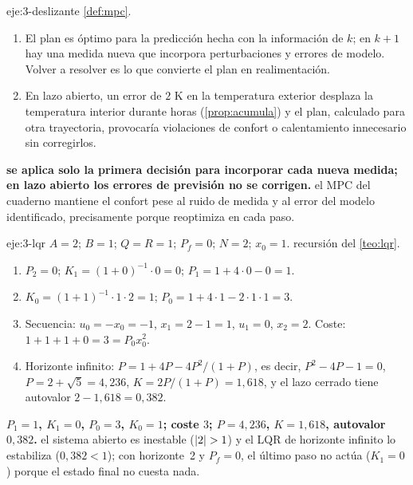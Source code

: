 \begin{solucion}{eje:3-deslizante}
\planteamiento \cref{def:mpc}.
\pasos
\begin{enumerate}[label=\arabic*.]
  \item El plan es óptimo para la predicción hecha con la información de $k$; en $k+1$ hay una medida nueva que incorpora perturbaciones y errores de modelo. Volver a resolver es lo que convierte el plan en realimentación.
  \item En lazo abierto, un error de $2$ K en la temperatura exterior desplaza la temperatura interior durante horas (\cref{prop:acumula}) y el plan, calculado para otra trayectoria, provocaría violaciones de confort o calentamiento innecesario sin corregirlos.
\end{enumerate}
\resultado \textbf{se aplica solo la primera decisión para incorporar cada nueva medida; en lazo abierto los errores de previsión no se corrigen.}
\comprobacion el MPC del cuaderno mantiene el confort pese al ruido de medida y al error del modelo identificado, precisamente porque reoptimiza en cada paso.
\end{solucion}

\begin{solucion}{eje:3-lqr}
\datos $A=2$; $B=1$; $Q=R=1$; $P_f=0$; $N=2$; $x_0=1$.
\planteamiento recursión del \cref{teo:lqr}.
\pasos
\begin{enumerate}[label=\arabic*.]
  \item $P_2=0$; $K_1=(1+0)^{-1}\cdot0=0$; $P_1=1+4\cdot0-0=1$.
  \item $K_0=(1+1)^{-1}\cdot1\cdot2=1$; $P_0=1+4\cdot1-2\cdot1\cdot1=3$.
  \item Secuencia: $u_0=-x_0=-1$, $x_1=2-1=1$, $u_1=0$, $x_2=2$. Coste: $1+1+1+0=3=P_0x_0^{2}$.
  \item Horizonte infinito: $P=1+4P-4P^{2}/(1+P)$, es decir, $P^{2}-4P-1=0$, $P=2+\sqrt5=4{,}236$, $K=2P/(1+P)=1{,}618$, y el lazo cerrado tiene autovalor $2-1{,}618=0{,}382$.
\end{enumerate}
\resultado \textbf{$P_1=1$, $K_1=0$, $P_0=3$, $K_0=1$; coste $3$; $P=4{,}236$, $K=1{,}618$, autovalor $0{,}382$.}
\comprobacion el sistema abierto es inestable ($\lvert2\rvert>1$) y el LQR de horizonte infinito lo estabiliza ($0{,}382<1$); con horizonte~2 y $P_f=0$, el último paso no actúa ($K_1=0$) porque el estado final no cuesta nada.
\end{solucion}

